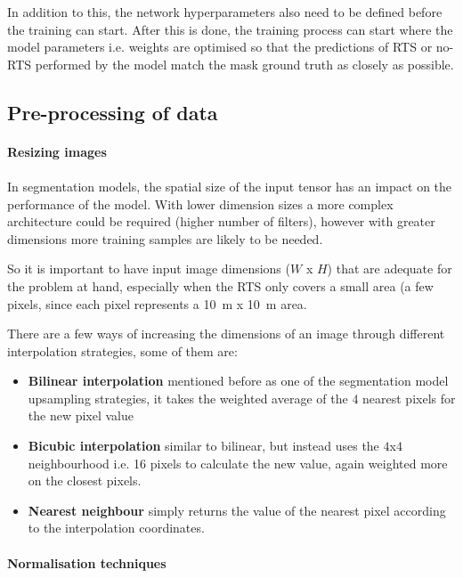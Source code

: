 In addition to this, the network hyperparameters also need to be defined before the training can start. After this is done, the training process can start where the model parameters i.e. weights are optimised so that the predictions of \gls{RTS} or no-\gls{RTS} performed by the model match the mask ground truth as closely as possible.

\subsection{Pre-processing of data} \label{data_preproc}

\paragraph{Resizing images} \label{img_resize}
\paragraph{}
In segmentation models, the spatial size of the input tensor has an impact on the performance of the model. With lower dimension sizes a more complex architecture could be required (higher number of filters), however with  greater dimensions more training samples are likely to be needed.

So it is important to have input image dimensions ($W$ x $H$) that are adequate for the problem at hand, especially when the \gls{RTS} only covers a small area (a few pixels, since each pixel represents a 10 m x 10 m area.

There are a few ways of increasing the dimensions of an image through different interpolation strategies, some of them are:
    \begin{itemize}
        \item \textbf{Bilinear interpolation} mentioned before as one of the segmentation model upsampling strategies, it takes the weighted average of the $4$ nearest pixels for the new pixel value
        \item \textbf{Bicubic interpolation} similar to bilinear, but instead uses the  $4$x$4$ neighbourhood i.e. 16 pixels to calculate the new value, again weighted more on the closest pixels. 
        \item \textbf{Nearest neighbour} simply returns the value of the nearest pixel according to the interpolation coordinates.
    \end{itemize}

\paragraph{Normalisation techniques} \label{img_norm}
